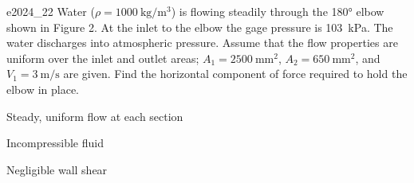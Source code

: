 
\begin{problemwithimage}{e2024_2}{2}
  Water ($\rho = \qty{1000}{\kg\per\m^3}$) is flowing steadily through the \ang{180} elbow shown in Figure 2. 
  At the inlet to the elbow the gage pressure is \qty{103}{\kPa}. 
  The water discharges into atmospheric pressure. 
  Assume that the flow properties are uniform over the inlet and outlet areas; $A_1 = \qty{2500}{\mm^2}$, $A_2 = \qty{650}{\mm^2 }$, and $V_1 = \qty{3}{\m\per\s}$ are given.
  Find the horizontal component of force required to hold the elbow in place.
\end{problemwithimage}

\begin{assumptions}
  \item Steady, uniform flow at each section
  \item Incompressible fluid
  \item Negligible wall shear
\end{assumptions}

